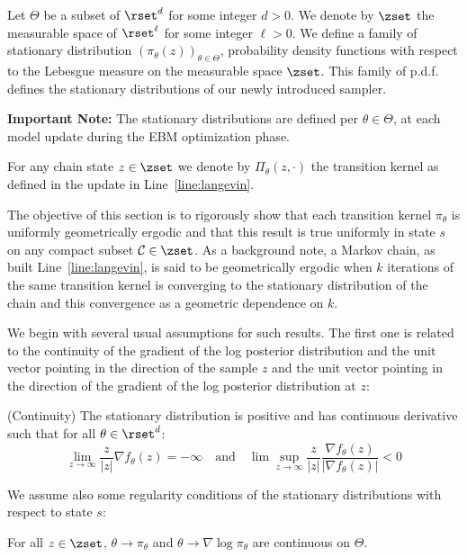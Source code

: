 \documentclass{article}
\begin{document}
Let $\Theta$ be a subset of $\rset^d$ for some integer $d >0$.
We denote by $\zset$ the measurable space of $\rset^\ell$ for some integer $\ell >0$.
We define a family of stationary distribution $\left(\pi_\theta(z) \right)_{\theta \in \Theta}$, probability density functions with respect to the Lebesgue measure on the measurable space $\zset$. This family of p.d.f. defines the stationary distributions of our newly introduced sampler.

\textbf{Important Note:} The stationary distributions are defined per $\theta \in \Theta$, \ie at each model update during the EBM optimization phase.

For any chain state $z \in \zset$ we denote by $\Pi_\theta(z,\cdot)$ the transition kernel as defined in the \algo update in Line~\ref{line:langevin}.

The objective of this section is to rigorously show that each transition kernel $\pi_\theta$ is uniformly geometrically ergodic and that this result is true uniformly in state $s$ on any compact subset $\mathcal{C} \in \zset$.
As a background note, a Markov chain, as built Line~\ref{line:langevin}, is said to be geometrically ergodic when $k$ iterations of the same transition kernel is converging to the stationary distribution of the chain and this convergence as a geometric dependence on $k$.

We begin with several usual assumptions for such results.
The first one is related to the continuity of the gradient of the log posterior distribution and the unit vector pointing in the direction of the sample $z$ and the unit vector pointing in the direction of the gradient of the log posterior distribution at $z$:
\begin{assumption}\label{ass:cont}
(Continuity) The stationary distribution is positive and has continuous derivative such that for all $\theta \in \rset^d$:
\begin{equation}
\lim \limits_{z \to \infty} \frac{z}{|z|} \nabla f_{\theta}(z) = - \infty \quad \textrm{and} \quad \lim \sup \limits_{z \to \infty} \frac{z}{|z|} \frac{\nabla f_{\theta}(z) }{|\nabla f_{\theta}(z) |} < 0
\end{equation}
\end{assumption}

We assume also some regularity conditions of the stationary distributions with respect to state $s$:
\begin{assumption}\label{ass:contlogpi}
For all $z \in \zset$, $\theta \to \pi_\theta$ and $\theta \to \nabla \log \pi_\theta$ are continuous on $\Theta$.
\end{assumption}
\end{document}
